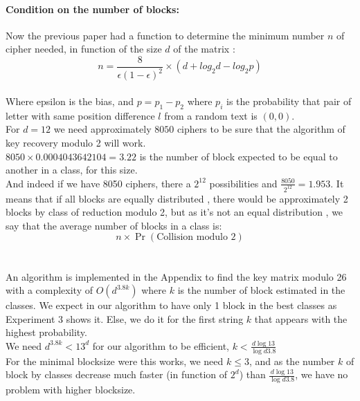 \documentclass{article}
\begin{document}
\paragraph{Condition on the number of blocks:}
Now the previous paper had a function to determine the minimum number $n$ of cipher needed, in function of the size $d$ of the matrix :
$$n = \frac{8}{\epsilon (1- \epsilon)^2} \times (d +log_2 d - log_2 p) $$\\
Where epsilon is the bias, and $p=p_1-p_2$ where $p_i$ is the probability that pair of letter with same position difference $l$ from a random text is $(0,0)$.\\
For $d=12$ we need approximately $8050$ ciphers to be sure that the algorithm of key recovery modulo 2 will work.\\
$8050 \times 0.0004043642104 = 3.22$ is the number of block expected to be equal to another in a class, for this size.\\
And indeed if we have 8050 ciphers, there a $2^{12}$ possibilities and $\frac{8050}{2^{12}} = 1.953$. It means that if all blocks are equally distributed , there would be approximately 2 blocks by class of reduction modulo 2, but as it's not an equal distribution , we say that the average number of blocks in a class is: $$n \times \Pr(\text{Collision modulo 2}) $$\\
\\
An algorithm is implemented in the Appendix to find the key matrix modulo 26 with a complexity of $O(d^{3.8 k})$ where $k$ is the number of block estimated in the classes. We expect in our algorithm to have only 1 block in the best classes as Experiment 3 shows it. Else, we do it for the first string $k$ that appears with the highest probability.\\
We need $d^{3.8k} < 13^d$ for our algorithm to be efficient, $k<\frac{d \log 13}{\log d 3.8}$\\
For the minimal blocksize were this works, we need $k \leq 3$, and as the number $k$ of block by classes decrease much faster (in function of $2^d$) than $\frac{d \log 13}{\log d 3.8}$, we have no problem with higher blocksize.\\
\end{document}
